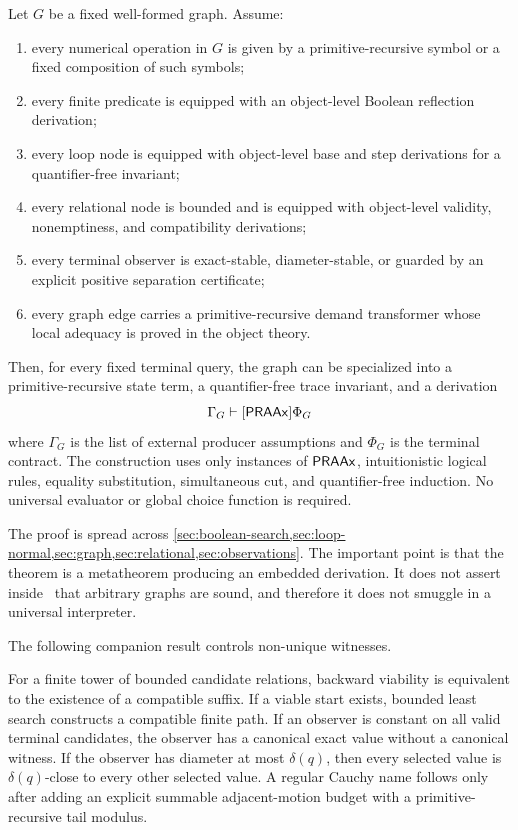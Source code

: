\begin{theorem}\label{thm:main-compilation}
Let \(G\) be a fixed well-formed \KIFC graph.  Assume:
\begin{enumerate}[label=(\alph*)]
  \item every numerical operation in \(G\) is given by a primitive-recursive symbol or a fixed composition of such symbols;
  \item every finite predicate is equipped with an object-level Boolean reflection derivation;
  \item every loop node is equipped with object-level base and step derivations for a quantifier-free invariant;
  \item every relational node is bounded and is equipped with object-level validity, nonemptiness, and compatibility derivations;
  \item every terminal observer is exact-stable, diameter-stable, or guarded by an explicit positive separation certificate;
  \item every graph edge carries a primitive-recursive demand transformer whose local adequacy is proved in the object theory.
\end{enumerate}
Then, for every fixed terminal query, the graph can be specialized into a primitive-recursive state term, a quantifier-free trace invariant, and a derivation
\[
  \Gamma_G \vdash[\mathsf{PRAAx}] \Phi_G
\]
where \(\Gamma_G\) is the list of external producer assumptions and \(\Phi_G\) is the terminal contract.  The construction uses only instances of \(\mathsf{PRAAx}\), intuitionistic logical rules, equality substitution, simultaneous cut, and quantifier-free induction.  No universal evaluator or global choice function is required.
\end{theorem}

The proof is spread across \cref{sec:boolean-search,sec:loop-normal,sec:graph,sec:relational,sec:observations}.  The important point is that the theorem is a metatheorem producing an embedded derivation.  It does not assert inside \iPRA\ that arbitrary graphs are sound, and therefore it does not smuggle in a universal interpreter.

The following companion result controls non-unique witnesses.

\begin{theorem}\label{thm:relational-summary}
For a finite tower of bounded candidate relations, backward viability is equivalent to the existence of a compatible suffix.  If a viable start exists, bounded least search constructs a compatible finite path.  If an observer is constant on all valid terminal candidates, the observer has a canonical exact value without a canonical witness.  If the observer has diameter at most \(\delta(q)\), then every selected value is \(\delta(q)\)-close to every other selected value.  A regular Cauchy name follows only after adding an explicit summable adjacent-motion budget with a primitive-recursive tail modulus.
\end{theorem}

